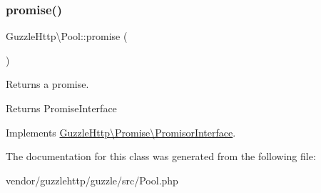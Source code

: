 \subsubsection{\texorpdfstring{promise()}{promise()}}
{\footnotesize\ttfamily Guzzle\+Http\textbackslash{}\+Pool\+::promise (\begin{DoxyParamCaption}{ }\end{DoxyParamCaption})}

Returns a promise.

\begin{DoxyReturn}{Returns}
Promise\+Interface 
\end{DoxyReturn}


Implements \hyperlink{interfaceGuzzleHttp_1_1Promise_1_1PromisorInterface_a228085a17057d886d5486c7c433be879}{Guzzle\+Http\textbackslash{}\+Promise\textbackslash{}\+Promisor\+Interface}.



The documentation for this class was generated from the following file\+:\begin{DoxyCompactItemize}
\item 
vendor/guzzlehttp/guzzle/src/Pool.\+php\end{DoxyCompactItemize}
